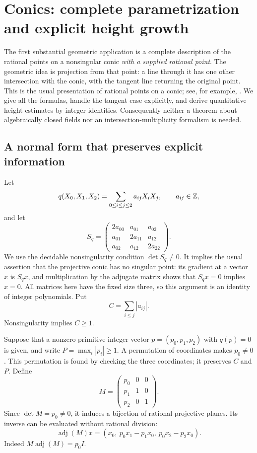 \section{Conics: complete parametrization and explicit height growth}
\label{sec:conics}

The first substantial geometric application is a complete description of
the rational points on a nonsingular conic \emph{with a supplied rational
point}.  The geometric idea is projection from that point: a line through
it has one other intersection with the conic, with the tangent line
returning the original point.  This is the usual presentation of rational
points on a conic; see, for example, \cite{sutherland2025}.  We give all the
formulas, handle the tangent case explicitly, and derive quantitative
height estimates by integer identities.  Consequently neither a theorem
about algebraically closed fields nor an intersection-multiplicity
formalism is needed.

\subsection{A normal form that preserves explicit information}

Let
\[
 q(X_0,X_1,X_2)=\sum_{0\leq i\leq j\leq2}a_{ij}X_iX_j,
 \qquad a_{ij}\in\mathbb Z,
\]
and let
\[
 S_q=\begin{pmatrix}
 2a_{00}&a_{01}&a_{02}\\
 a_{01}&2a_{11}&a_{12}\\
 a_{02}&a_{12}&2a_{22}
 \end{pmatrix}.
\]
We use the decidable nonsingularity condition $\det S_q\ne0$.
It implies the usual assertion that the projective conic has no singular
point: its gradient at a vector $x$ is $S_qx$, and multiplication by the
adjugate matrix shows that $S_qx=0$ implies $x=0$.  All matrices here have
the fixed size three, so this argument is an identity of integer
polynomials.  Put
\[
 C=\sum_{i\leq j}|a_{ij}|.
\]
Nonsingularity implies $C\geq1$.

Suppose that a nonzero primitive integer vector
$p=(p_0,p_1,p_2)$ with $q(p)=0$ is given, and write
$P=\max_i|p_i|\geq1$.  A permutation of coordinates makes $p_0\ne0$.
This permutation is found by checking the three coordinates; it preserves
$C$ and $P$.  Define
\[
 M=\begin{pmatrix}p_0&0&0\\p_1&1&0\\p_2&0&1\end{pmatrix}.
\]
Since $\det M=p_0\ne0$, it induces a bijection of rational projective
planes.  Its inverse can be evaluated without rational division:
\begin{equation}\label{eq:conic-adjugate}
 \operatorname{adj}(M)x
 =(x_0,\ p_0x_1-p_1x_0,\ p_0x_2-p_2x_0).
\end{equation}
Indeed $M\operatorname{adj}(M)=p_0I$.

